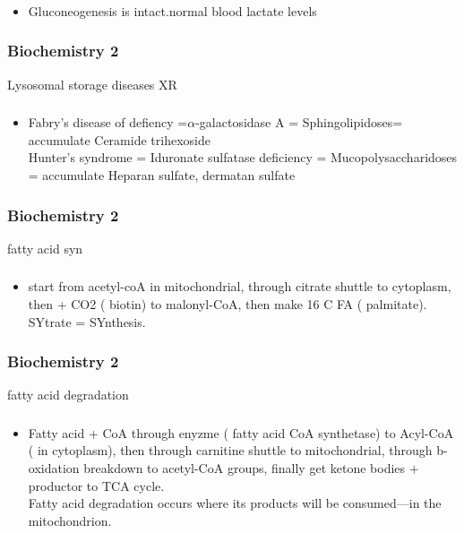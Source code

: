 \documentclass[11pt]{beamer}
\begin{document}
\begin{frame}
 \frametitle{}
\begin{itemize}
\item Gluconeogenesis is intact.normal blood lactate levels
\end{itemize}
\end{frame}

\begin{frame}
 \frametitle{Biochemistry 2}
Lysosomal storage diseases XR 
\end{frame}

\begin{frame}
 \frametitle{}
\begin{itemize}
\item Fabry’s disease of defiency =${\alpha}$-galactosidase A = Sphingolipidoses= accumulate Ceramide	trihexoside \\ Hunter’s syndrome = Iduronate sulfatase deficiency =  Mucopolysaccharidoses = accumulate Heparan sulfate,	 dermatan sulfate
\end{itemize}
\end{frame}

\begin{frame}
 \frametitle{Biochemistry 2}
fatty acid syn 
\end{frame}

\begin{frame}
 \frametitle{}
\begin{itemize}
\item start from acetyl-coA in mitochondrial, through citrate shuttle to cytoplasm, then + CO2 ( biotin) to malonyl-CoA, then make 16 C FA ( palmitate).  \\ SYtrate = SYnthesis.
\end{itemize}
\end{frame}

\begin{frame}
 \frametitle{Biochemistry 2}
fatty acid degradation 
\end{frame}

\begin{frame}
 \frametitle{}
\begin{itemize}
\item Fatty acid + CoA through enyzme ( fatty acid CoA synthetase) to Acyl-CoA ( in cytoplasm), then through carnitine shuttle to mitochondrial, through b-oxidation breakdown to acetyl-CoA groups, finally get ketone bodies + productor to TCA cycle.  \\ Fatty acid degradation occurs where its products will be consumed—in the mitochondrion.
\end{itemize}
\end{frame}
\end{document}
